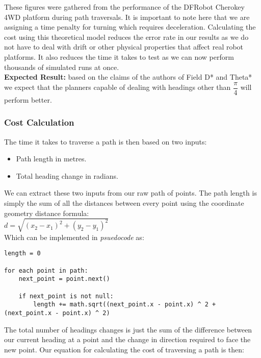 \noindent
These figures were gathered from the performance of the DFRobot Cherokey 4WD platform during path traversals. It is important to note here that we are assigning a time penalty for turning which requires deceleration. Calculating the cost using this theoretical model reduces the error rate in our results as we do not have to deal with drift or other physical properties that affect real robot platforms. It also reduces the time it takes to test as we can now perform thousands of simulated runs at once. \\

\noindent
\textbf{Expected Result:} based on the claims of the authors of Field D* and Theta* we expect that the planners capable of dealing with headings other than $\dfrac{\pi}{4}$ will perform better.

\newpage

\subsubsection{Cost Calculation}

\noindent
The time it takes to traverse a path is then based on two inputs:

\begin{itemize}
\item Path length in metres.
\item Total heading change in radians.
\end{itemize}

\noindent
We can extract these two inputs from our raw path of points. The path length is simply the sum of all the distances between every point using the coordinate geometry distance formula: \\

\indent $d = \sqrt{(x_{2} - x_{1})^{2} + (y_{2} - y_{1})^{2}}$ \\

\noindent
Which can be implemented in \textit{psuedocode} as: \\

\begin{lstlisting}
length = 0

for each point in path:
	next_point = point.next()
	
	if next_point is not null:
		length += math.sqrt((next_point.x - point.x) ^ 2 + (next_point.x - point.x) ^ 2)
\end{lstlisting}

\noindent
The total number of headings changes is just the sum of the difference between our current heading at a point and the change in direction required to face the new point. Our equation for calculating the cost of traversing a path is then: \\

